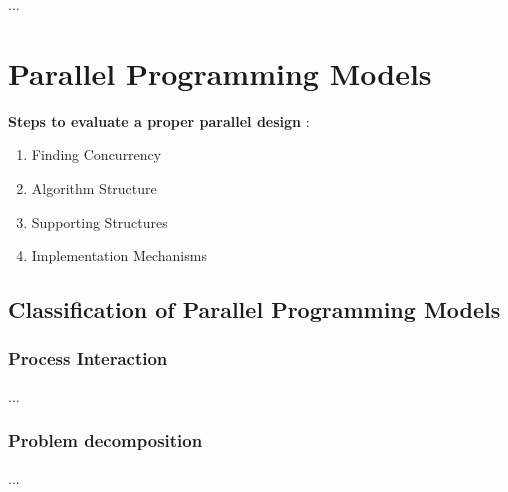 ...\parencite[see][p24]{book1}

\section{Parallel Programming Models}

\textbf{Steps to evaluate a proper parallel design} \parencite[see][p6]{article6}:
\begin{enumerate}
	\item Finding Concurrency
	\item Algorithm Structure
	\item Supporting Structures
	\item Implementation Mechanisms
\end{enumerate}

\newpage

\subsection{Classification of Parallel Programming Models}

\subsubsection{Process Interaction}

...\parencite[see][p4]{internet1}

\subsubsection{Problem decomposition}

...\parencite[see][p105 ff.]{book1}